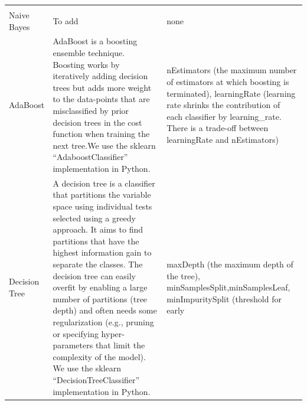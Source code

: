 \documentclass[]{article}
\begin{document}
\begin{longtable}[]{@{}lll@{}}
\begin{minipage}[t]{0.25\columnwidth}
\end{minipage}\tabularnewline
\begin{minipage}[t]{0.12\columnwidth}\raggedright\strut
Naive Bayes\strut
\end{minipage} & \begin{minipage}[t]{0.55\columnwidth}\raggedright\strut
To add\strut
\end{minipage} & \begin{minipage}[t]{0.25\columnwidth}\raggedright\strut
none\strut
\end{minipage}\tabularnewline
\begin{minipage}[t]{0.12\columnwidth}\raggedright\strut
AdaBoost\strut
\end{minipage} & \begin{minipage}[t]{0.55\columnwidth}\raggedright\strut
AdaBoost is a boosting ensemble technique. Boosting works by iteratively
adding decision trees but adds more weight to the data-points that are
misclassified by prior decision trees in the cost function when training
the next tree.We use the sklearn ``AdaboostClassifier'' implementation
in Python.\strut
\end{minipage} & \begin{minipage}[t]{0.25\columnwidth}\raggedright\strut
nEstimators (the maximum number of estimators at which boosting is
terminated), learningRate (learning rate shrinks the contribution of
each classifier by learning\_rate. There is a trade-off between
learningRate and nEstimators)\strut
\end{minipage}\tabularnewline
\begin{minipage}[t]{0.12\columnwidth}\raggedright\strut
Decision Tree\strut
\end{minipage} & \begin{minipage}[t]{0.55\columnwidth}\raggedright\strut
A decision tree is a classifier that partitions the variable space using
individual tests selected using a greedy approach. It aims to find
partitions that have the highest information gain to separate the
classes. The decision tree can easily overfit by enabling a large number
of partitions (tree depth) and often needs some regularization (e.g.,
pruning or specifying hyper-parameters that limit the complexity of the
model). We use the sklearn ``DecisionTreeClassifier'' implementation in
Python.\strut
\end{minipage} & \begin{minipage}[t]{0.25\columnwidth}\raggedright\strut
maxDepth (the maximum depth of the tree),
minSamplesSplit,minSamplesLeaf, minImpuritySplit (threshold for early

\end{minipage}
\end{longtable}
\end{document}

